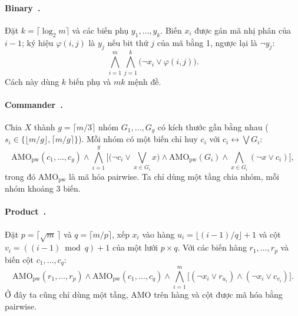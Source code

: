 \documentclass[a4paper,fleqn]{cas-sc}
\newcommand{\AMO}{\mathrm{AMO}}
\begin{document}
\paragraph{Binary~\citep{frisch2010}.} Đặt $k=\lceil\log_2 m\rceil$ và các biến phụ $y_1,\dots,y_k$. Biến $x_i$ được gán mã nhị phân của $i-1$; ký hiệu $\varphi(i,j)$ là $y_j$ nếu bit thứ $j$ của mã bằng 1, ngược lại là $\neg y_j$:
\begin{equation}
\bigwedge_{i=1}^{m}\bigwedge_{j=1}^{k}\big(\neg x_i\vee\varphi(i,j)\big). \label{eq:bin}
\end{equation}
Cách này dùng $k$ biến phụ và $mk$ mệnh đề.

\paragraph{Commander~\citep{klieber2007}.} Chia $X$ thành $g=\lceil m/3\rceil$ nhóm $G_1,\dots,G_g$ có kích thước gần bằng nhau ($s_i\in\{\lfloor m/g\rfloor,\lceil m/g\rceil\}$). Mỗi nhóm có một biến chỉ huy $c_i$ với $c_i\leftrightarrow\bigvee G_i$:
\begin{equation}
\AMO_{\mathrm{pw}}(c_1,\dots,c_g)\wedge\bigwedge_{i=1}^{g}\Big[\big(\neg c_i\vee\textstyle\bigvee_{x\in G_i}x\big)\wedge\AMO_{\mathrm{pw}}(G_i)\wedge\textstyle\bigwedge_{x\in G_i}(\neg x\vee c_i)\Big], \label{eq:cmd}
\end{equation}
trong đó $\AMO_{\mathrm{pw}}$ là mã hóa pairwise. Ta chỉ dùng một tầng chia nhóm, mỗi nhóm khoảng 3 biến.

\paragraph{Product~\citep{chen2010}.} Đặt $p=\lceil\sqrt m\,\rceil$ và $q=\lceil m/p\rceil$, xếp $x_i$ vào hàng $u_i=\lfloor (i-1)/q\rfloor+1$ và cột $v_i=((i-1)\bmod q)+1$ của một lưới $p\times q$. Với các biến hàng $r_1,\dots,r_p$ và biến cột $c_1,\dots,c_q$:
\begin{equation}
\AMO_{\mathrm{pw}}(r_1,\dots,r_p)\wedge\AMO_{\mathrm{pw}}(c_1,\dots,c_q)\wedge\bigwedge_{i=1}^{m}\big[(\neg x_i\vee r_{u_i})\wedge(\neg x_i\vee c_{v_i})\big]. \label{eq:prod}
\end{equation}
Ở đây ta cũng chỉ dùng một tầng, AMO trên hàng và cột được mã hóa bằng pairwise.

\begin{table}[t]
\caption{Kích thước của một ràng buộc AMO trên $m$ literal. Bốn cột cuối ghi ``số biến phụ / số mệnh đề'' với $m=N\in\{9,16,25,64\}$, do chương trình sinh ra và trùng với công thức ở mọi $2\le m\le 200$.}
\label{tab:amo}
\centering\small

\end{table}
\end{document}
